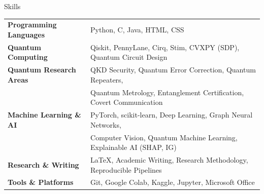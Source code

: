 \documentclass{resume} %
\begin{document}
\begin{rSection}{Skills}

\begin{tabular}{ @{} >{\bfseries}l @{\hspace{6ex}} l }
Programming Languages & Python, C, Java, HTML, CSS \\
Quantum Computing & Qiskit, PennyLane, Cirq, Stim, CVXPY (SDP), Quantum Circuit Design \\
Quantum Research Areas & QKD Security, Quantum Error Correction, Quantum Repeaters, \\
 & Quantum Metrology, Entanglement Certification, Covert Communication \\
Machine Learning \& AI & PyTorch, scikit-learn, Deep Learning, Graph Neural Networks, \\
 & Computer Vision, Quantum Machine Learning, Explainable AI (SHAP, IG) \\
Research \& Writing & \LaTeX, Academic Writing, Research Methodology, Reproducible Pipelines \\
Tools \& Platforms & Git, Google Colab, Kaggle, Jupyter, Microsoft Office \\
\end{tabular}
\end{rSection}
\end{document}
